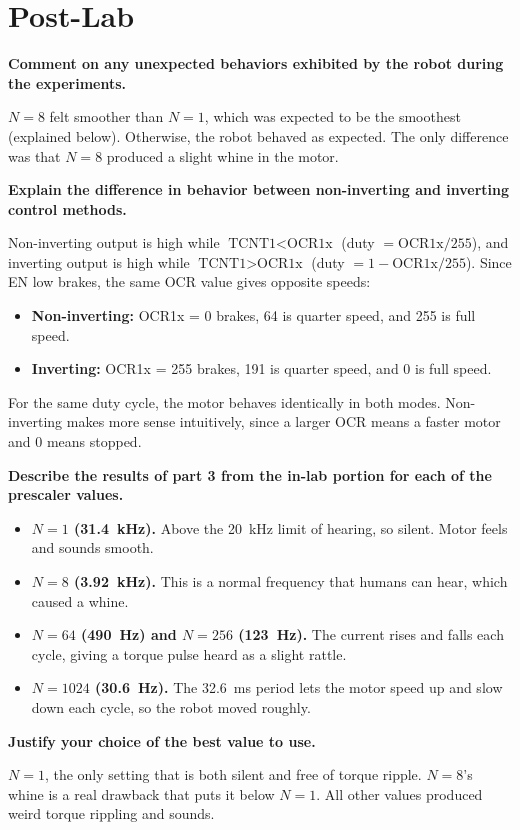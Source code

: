 \documentclass[11pt]{article}
\newcommand{\question}[1]{\par\medskip\noindent\textbf{#1}\par\noindent\ignorespaces}
\begin{document}
\section{Post-Lab}
\question{Comment on any unexpected behaviors exhibited by the robot during the experiments.}
$N = 8$ felt smoother than $N = 1$, which was expected to be the smoothest (explained below). Otherwise, the robot behaved as expected. The only difference was that $N = 8$ produced a slight whine in the motor.

\question{Explain the difference in behavior between non-inverting and inverting control methods.}
Non-inverting output is high while $\text{TCNT1} < \text{OCR1x}$ (duty $= \text{OCR1x}/255$), and inverting output is high while $\text{TCNT1} > \text{OCR1x}$ (duty $= 1 - \text{OCR1x}/255$). Since EN low brakes, the same OCR value gives opposite speeds:
\begin{itemize}
\item \textbf{Non-inverting:} OCR1x = 0 brakes, 64 is quarter speed, and 255 is full speed.
\item \textbf{Inverting:} OCR1x = 255 brakes, 191 is quarter speed, and 0 is full speed.
\end{itemize}
For the same duty cycle, the motor behaves identically in both modes. Non-inverting makes more sense intuitively, since a larger OCR means a faster motor and 0 means stopped.

\question{Describe the results of part 3 from the in-lab portion for each of the prescaler values.}
\begin{itemize}
\item \textbf{$N = 1$ (31.4~kHz).} Above the 20~kHz limit of hearing, so silent. Motor feels and sounds smooth.
\item \textbf{$N = 8$ (3.92~kHz).} This is a normal frequency that humans can hear, which caused a whine.
\item \textbf{$N = 64$ (490~Hz) and $N = 256$ (123~Hz).} The current rises and falls each cycle, giving a torque pulse heard as a slight rattle.
\item \textbf{$N = 1024$ (30.6~Hz).} The 32.6~ms period lets the motor speed up and slow down each cycle, so the robot moved roughly.
\end{itemize}

\question{Justify your choice of the best value to use.}
$N = 1$, the only setting that is both silent and free of torque ripple. $N = 8$'s whine is a real drawback that puts it below $N = 1$. All other values produced weird torque rippling and sounds.
\end{document}
